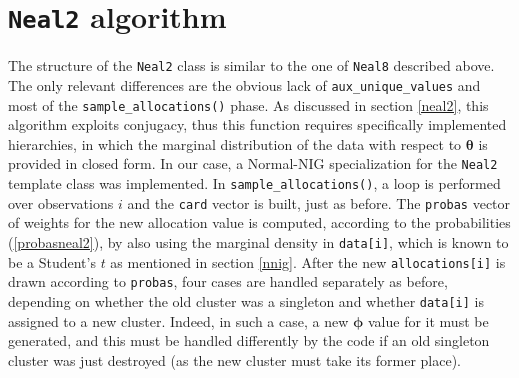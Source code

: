 \section{\texttt{Neal2} algorithm}
The structure of the \verb|Neal2| class is similar to the one of \verb|Neal8| described above.
The only relevant differences are the obvious lack of \verb|aux_unique_values| and most of the \verb|sample_allocations()| phase.
As discussed in section \ref{neal2}, this algorithm exploits conjugacy, thus this function requires specifically implemented hierarchies, in which the marginal distribution of the data with respect to $\boldsymbol\theta$ is provided in closed form.
In our case, a Normal-NIG specialization for the \verb|Neal2| template class was implemented.
In \verb|sample_allocations()|, a loop is performed over observations $i$ and the \verb|card| vector is built, just as before.
The \verb|probas| vector of weights for the new allocation value is computed, according to the probabilities (\ref{probasneal2}), by also using the marginal density in \verb|data[i]|, which is known to be a Student's $t$ as mentioned in section \ref{nnig}.
After the new \verb|allocations[i]| is drawn according to \verb|probas|, four cases are handled separately as before, depending on whether the old cluster was a singleton and whether \verb|data[i]| is assigned to a new cluster.
Indeed, in such a case, a new $\boldsymbol\phi$ value for it must be generated, and this must be handled differently by the code if an old singleton cluster was just destroyed (as the new cluster must take its former place).
